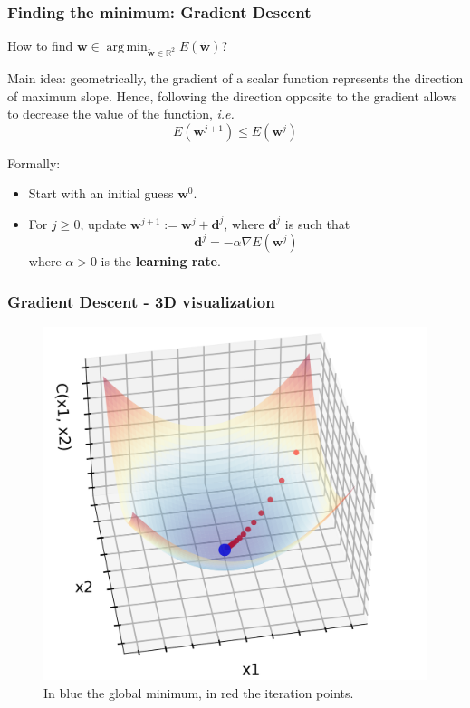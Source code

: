 \documentclass{beamer}
\DeclareMathOperator*{\argmin}{arg\,min}
\begin{document}
	\begin{frame}
		\frametitle{Finding the minimum: Gradient Descent}
		How to find $\bm{w} \in \argmin_{\tilde{\bm{w}} \in \mathbb{R}^2} E(\tilde{\bm{w}})$?
		
		\vspace{5mm}
		
		Main idea: geometrically, the gradient of a scalar function represents the direction of maximum slope. Hence, following the direction opposite to the gradient allows to decrease the value of the function, \textit{i.e.}
		\begin{equation*}
			E(\bm{w}^{j+1}) \leq E(\bm{w}^j) 
		\end{equation*}
		
		\vspace{5mm}
		
		Formally:
		\begin{itemize}
			\item Start with an initial guess $\bm{w}^0$.
			\item For $j \geq 0$, update $\bm{w}^{j+1} := \bm{w}^{j} + \bm{d}^j$, where $\bm{d}^j$ is such that
			$$\bm{d}^j = - \alpha \nabla E(\bm{w}^j)$$
			where $\alpha>0$ is the \textbf{learning rate}.
		\end{itemize}
	
	\end{frame}

	\begin{frame}
		\frametitle{Gradient Descent - 3D visualization}
		\begin{figure}
			\centering
			\includegraphics[scale=0.4]{images/gradient_descent_3D}
			\caption{In blue the global minimum, in red the iteration points.}
		\end{figure}
	\end{frame}
\end{document}
